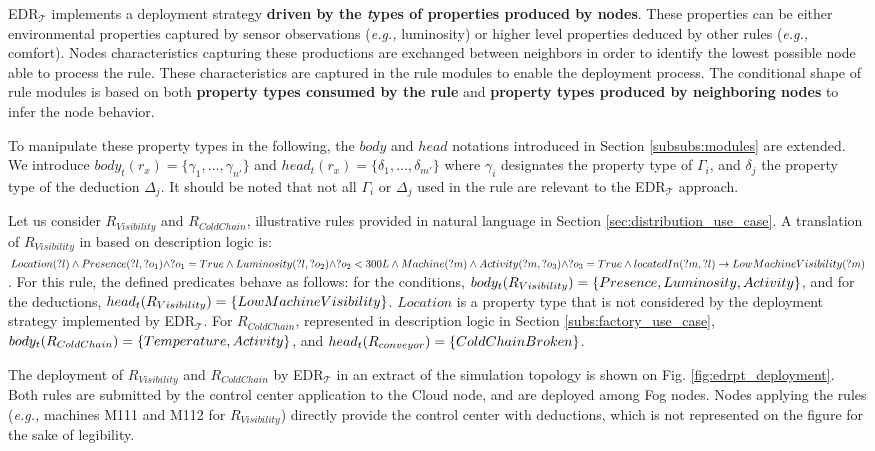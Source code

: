\documentclass{iosart2c}
\newcommand{\edrt}{EDR$_{\mathcal{T}}$\xspace}
\begin{document}
\edrt implements a deployment strategy \textbf{driven by the \textit{t}ypes of properties produced by nodes}.
These properties can be either environmental properties captured by sensor observations (\textit{e.g.,} luminosity) or higher level properties deduced by other rules (\textit{e.g.,} comfort).
Nodes characteristics capturing these productions are exchanged between neighbors in order to identify the lowest possible node able to process the rule.
These characteristics are captured in the rule modules to enable the deployment process.
The conditional shape of rule modules is based on both \textbf{property types consumed by the rule} and \textbf{property types produced by neighboring nodes} to infer the node behavior.

To manipulate these property types in the following, the $body$ and $head$ notations introduced in Section \textsection \ref{subsubs:modules} are extended. 
We introduce $body_t(r_{x})=\{\gamma_{1},...,\gamma_{n'}\}$ and $head_t(r_{x})=\{\delta_{1}, ..., \delta_{m'}\}$ where $\gamma_{i}$ designates the property type of $\Gamma_{i}$, and $\delta_{j}$ the property type of the deduction $\Delta_{j}$.
It should be noted that not all $\Gamma_{i}$ or $\Delta_{j}$ used in the rule are relevant to the \edrt approach.

Let us consider $R_{Visibility}$ and $R_{ColdChain}$, illustrative rules provided in natural language in Section \textsection \ref{sec:distribution_use_case}. 
A translation of $R_{Visibility}$ in based on description logic is: $Lo\-ca\-tion(?l) \land Pre\-sence(?l, ?o_1) \land ?o_1 = True \land Lu\-mi\-no\-si\-ty(?l, ?o_2) \land ?o_2 < 300L \land Ma\-chine(?m) \land Ac\-ti\-vi\-ty(?m, ?o_3) \land ?o_3 = True \land located\-In(?m, ?l) \rightarrow Low\-Machine\-Vi\-si\-bi\-li\-ty(?m)$.
For this rule, the defined predicates behave as follows: for the conditions, $body_t(R_{Visibility})=\{Pre\-sence, Lu\-mi\-no\-si\-ty, Ac\-ti\-vi\-ty\}$, and for the deductions,  $head_t(R_{Visibility})= \{Low\-Ma\-chine\-Vi\-si\-bi\-li\-ty\}$. 
$Location$ is a property type that is not considered by the deployment strategy implemented by \edrt.
For $R_{ColdChain}$, represented in description logic in Section \textsection \ref{subs:factory_use_case}, $body_t(R_{ColdChain})=\{Tem\-pe\-ra\-ture, Ac\-ti\-vi\-ty\}$, and $head_t(R_{conveyor})= \{Cold\-Chain\-Bro\-ken\}$.

The deployment of $R_{Visibility}$ and $R_{ColdChain}$ by \edrt in an extract of the simulation topology is shown on Fig. \ref{fig:edrpt_deployment}.
Both rules are submitted by the control center application to the Cloud node, and are deployed among Fog nodes.
Nodes applying the rules (\textit{e.g.,} machines M111 and M112 for $R_{Visibility}$) directly provide the control center with deductions, which is not represented on the figure for the sake of legibility.
\end{document}
